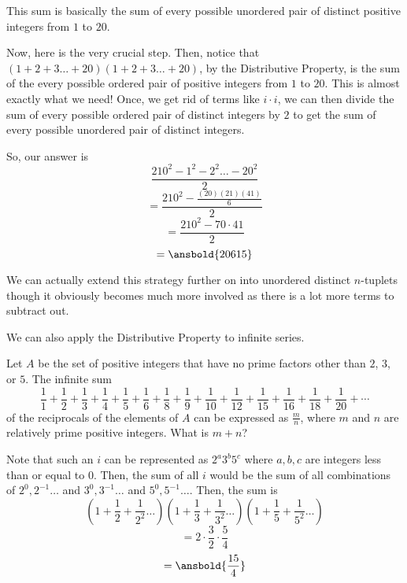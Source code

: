 \documentclass[11pt]{article}
\begin{document}
\begin{sol}
This sum is basically the sum of every possible unordered pair of distinct positive integers from $1$ to $20$.

Now, here is the very crucial step. Then, notice that $(1+2+3\ldots + 20)(1+2+3\ldots + 20)$, by the Distributive Property, is the sum of the every possible ordered pair of positive integers from $1$ to $20$. This is almost exactly what we need! Once, we get rid of terms like $i\cdot i$, we can then divide the sum of every possible ordered pair of distinct integers by $2$ to get the sum of every possible unordered pair of distinct integers.

So, our answer is
$$\frac{210^2-1^2-2^2\ldots - 20^2}{2}$$
$$=\frac{210^2-\frac{(20)(21)(41)}{6}}{2}$$
$$=\frac{210^2-70\cdot 41}{2}$$
$$=\ansbold{20615}$$
\end{sol}

We can actually extend this strategy further on into unordered distinct $n$-tuplets though it obviously becomes much more involved as there is a lot more terms to subtract out.

We can also apply the Distributive Property to infinite series.

\begin{exam}[2018 AMC 12A/18]
Let $A$ be the set of positive integers that have no prime factors other than $2$, $3$, or $5$. The infinite sum $$\frac{1}{1} + \frac{1}{2} + \frac{1}{3} + \frac{1}{4} + \frac{1}{5} + \frac{1}{6} + \frac{1}{8} + \frac{1}{9} + \frac{1}{10} + \frac{1}{12} + \frac{1}{15} + \frac{1}{16} + \frac{1}{18} + \frac{1}{20} + \cdots$$of the reciprocals of the elements of $A$ can be expressed as $\frac{m}{n}$, where $m$ and $n$ are relatively prime positive integers. What is $m+n$?
\end{exam}

\begin{sol}
Note that such an $i$ can be represented as $2^{a}3^{b}5^{c}$ where $a,b,c$ are integers less than or equal to $0$. Then, the sum of all $i$ would be the sum of all combinations of $2^{0},2^{-1}\ldots$ and $3^{0},3^{-1}\ldots$ and $5^{0},5^{-1}\ldots $. Then, the sum is
$$(1+\frac{1}{2}+\frac{1}{2^2}\ldots)(1+\frac{1}{3}+\frac{1}{3^2}\ldots)(1+\frac{1}{5}+\frac{1}{5^2}\ldots)$$
$$=2\cdot \frac{3}{2}\cdot \frac{5}{4}$$
$$=\ansbold{\frac{15}{4}}$$
\end{sol}

\end{document}
